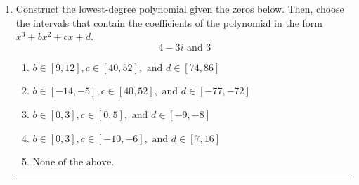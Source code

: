 \documentclass[14pt]{extbook}
\newcommand{\litem}[1]{\item#1\hspace*{-1cm}\rule{\textwidth}{0.4pt}}
\begin{document}
\begin{enumerate}
{\begin{enumerate}[label=\Alph*.]
\end{enumerate} }
\litem{
Construct the lowest-degree polynomial given the zeros below. Then, choose the intervals that contain the coefficients of the polynomial in the form $x^3+bx^2+cx+d$.\[ 4 - 3 i \text{ and } 3 \]\begin{enumerate}[label=\Alph*.]
\item \( b \in [9, 12], c \in [40, 52], \text{ and } d \in [74, 86] \)
\item \( b \in [-14, -5], c \in [40, 52], \text{ and } d \in [-77, -72] \)
\item \( b \in [0, 3], c \in [0, 5], \text{ and } d \in [-9, -8] \)
\item \( b \in [0, 3], c \in [-10, -6], \text{ and } d \in [7, 16] \)
\item \( \text{None of the above.} \)


\end{enumerate}}
\end{enumerate}
\end{document}
